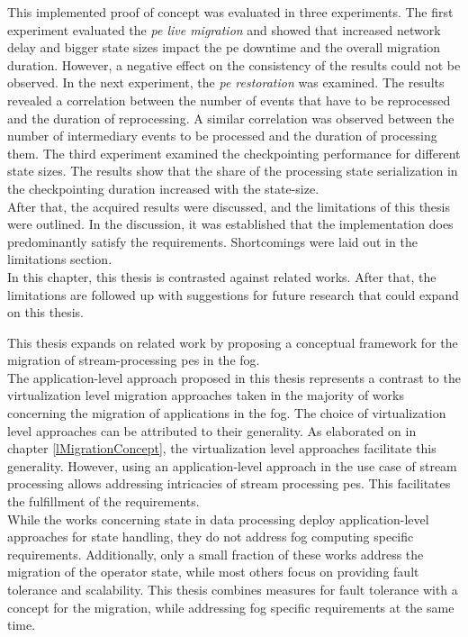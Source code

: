 This implemented proof of concept was evaluated in three experiments. The first experiment evaluated the \textit{\acrshort{pe} live migration} and showed that increased network delay and bigger state sizes impact the \gls{pe} downtime and the overall migration duration. However, a negative effect on the consistency of the results could not be observed. In the next experiment, the \textit{\acrshort{pe} restoration} was examined. The results revealed a correlation between the number of events that have to be reprocessed and the duration of reprocessing. A similar correlation was observed between the number of intermediary events to be processed and the duration of processing them. The third experiment examined the checkpointing performance for different state sizes. The results show that the share of the processing state serialization in the checkpointing duration increased with the state-size.\\
After that, the acquired results were discussed, and the limitations of this thesis were outlined. In the discussion, it was established that the implementation does predominantly satisfy the requirements. Shortcomings were laid out in the limitations section.\\
In this chapter, this thesis is contrasted against related works. After that, the limitations are followed up with suggestions for future research that could expand on this thesis.\par


This thesis expands on related work by proposing a conceptual framework for the migration of stream-processing \gls{pe}s in the fog.\\
The application-level approach proposed in this thesis represents a contrast to the virtualization level migration approaches taken in the majority of works concerning the migration of applications in the fog. The choice of virtualization level approaches can be attributed to their generality. As elaborated on in chapter \ref{lMigrationConcept}, the virtualization level approaches facilitate this generality. However, using an application-level approach in the use case of stream processing allows addressing intricacies of stream processing \gls{pe}s. This facilitates the fulfillment of the requirements.\\
While the works concerning state in data processing deploy application-level approaches for state handling, they do not address fog computing specific requirements. Additionally, only a small fraction of these works address the migration of the operator state, while most others focus on providing fault tolerance and scalability. This thesis combines measures for fault tolerance with a concept for the migration, while addressing fog specific requirements at the same time.




